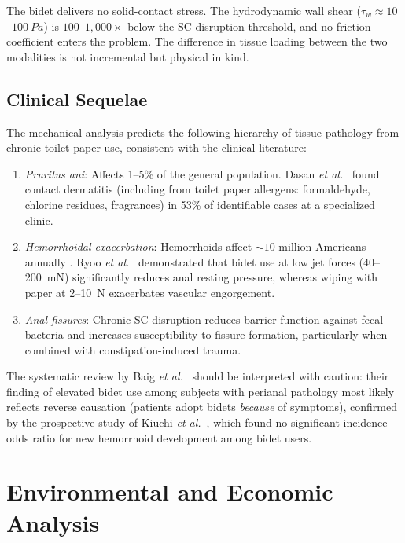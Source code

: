 \documentclass[aps,prfluids,reprint,amsmath,amssymb,floatfix]{revtex4-2}
\begin{document}
The bidet delivers no solid-contact stress. The hydrodynamic wall shear
($\tau_w \approx 10$--$\SI{100}{Pa}$) is $100$--$1{,}000\times$ below the
SC disruption threshold, and no friction coefficient enters the problem.
The difference in tissue loading between the two modalities is not
incremental but physical in kind.

\subsection{Clinical Sequelae}
\label{subsec:clinical}

The mechanical analysis predicts the following hierarchy of tissue pathology
from chronic toilet-paper use, consistent with the clinical literature:

\begin{enumerate}[leftmargin=*]
    \item \emph{Pruritus ani}: Affects 1--5\% of the general population.
    Dasan \textit{et al.}\ \citep{Dasan1999} found contact dermatitis (including
    from toilet paper allergens: formaldehyde, chlorine residues, fragrances)
    in 53\% of identifiable cases at a specialized clinic.
    \item \emph{Hemorrhoidal exacerbation}: Hemorrhoids affect $\sim10$ million
    Americans annually \citep{Peery2014}. Ryoo \textit{et al.}\ \citep{Ryoo2011}
    demonstrated that bidet use at low jet forces (40--\SI{200}{mN}) significantly
    reduces anal resting pressure, whereas wiping with paper at 2--\SI{10}{N}
    exacerbates vascular engorgement.
    \item \emph{Anal fissures}: Chronic SC disruption reduces barrier function
    against fecal bacteria and increases susceptibility to fissure formation,
    particularly when combined with constipation-induced trauma.
\end{enumerate}

The systematic review by Baig \textit{et al.}\ \citep{Baig2022} should be
interpreted with caution: their finding of elevated bidet use among subjects
with perianal pathology most likely reflects reverse causation (patients adopt
bidets \emph{because} of symptoms), confirmed by the prospective study of
Kiuchi \textit{et al.}\ \citep{Kiuchi2017}, which found no significant incidence
odds ratio for new hemorrhoid development among bidet users.

\section{Environmental and Economic Analysis}
\label{sec:enviro}
\end{document}
